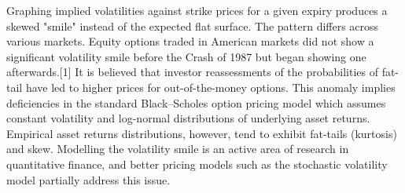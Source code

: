 Graphing implied volatilities against strike prices for a given expiry produces a skewed "smile" instead of the expected flat surface. The pattern differs across various markets. Equity options traded in American markets did not show a significant volatility smile before the Crash of 1987 but began showing one afterwards.[1] It is believed that investor reassessments of the probabilities of fat-tail have led to higher prices for out-of-the-money options. This anomaly implies deficiencies in the standard Black–Scholes option pricing model which assumes constant volatility and log-normal distributions of underlying asset returns. Empirical asset returns distributions, however, tend to exhibit fat-tails (kurtosis) and skew. Modelling the volatility smile is an active area of research in quantitative finance, and better pricing models such as the stochastic volatility model partially address this issue.